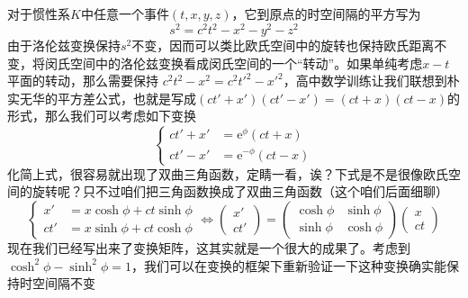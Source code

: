 \documentclass[12pt, a4paper, oneside]{ctexbook}
\begin{document}
对于惯性系$K$中任意一个事件$(t,x,y,z)$，它到原点的时空间隔的平方写为
\begin{equation}
	s^{2}=c^{2}t^{2}-x^{2}-y^{2}-z^{2}
\end{equation}
由于洛伦兹变换保持$s^{2}$不变，因而可以类比欧氏空间中的旋转也保持欧氏距离不变，将闵氏空间中的洛伦兹变换看成闵氏空间的一个“转动”。如果单纯考虑$x-t$平面的转动，那么需要保持 $c^{2}t^{2}-x^{2}=c^{2}t'^{2}-x'^{2}$，高中数学训练让我们联想到朴实无华的平方差公式，也就是写成$(ct'+x')(ct'-x')=(ct+x)(ct-x)$的形式，那么我们可以考虑如下变换
\begin{equation}
	\left\{\begin{aligned}
		ct'+x'&=\mathrm{e}^{\phi}(ct+x)\\
		ct'-x'&=\mathrm{e}^{-\phi}(ct-x)
	\end{aligned}\right.
\end{equation}
化简上式，很容易就出现了双曲三角函数，定睛一看，诶？下式是不是很像欧氏空间的旋转呢？只不过咱们把三角函数换成了双曲三角函数（这个咱们后面细聊）
\begin{equation}
	\left\{\begin{aligned}
		x'&=x\cosh\phi+ct\sinh\phi\\
		ct'&=x\sinh\phi+ct\cosh\phi
	\end{aligned}\right.\Leftrightarrow
	\begin{pmatrix}
		x' \\ ct'
	\end{pmatrix}=
	\begin{pmatrix}
		\cosh\phi & \sinh\phi \\
		\sinh\phi & \cosh\phi
	\end{pmatrix}
	\begin{pmatrix}
		x \\ ct
	\end{pmatrix}
\end{equation}
现在我们已经写出来了变换矩阵，这其实就是一个很大的成果了。考虑到$\cosh^{2}\phi-\sinh^{2}\phi=1$，我们可以在变换的框架下重新验证一下这种变换确实能保持时空间隔不变
\end{document}
